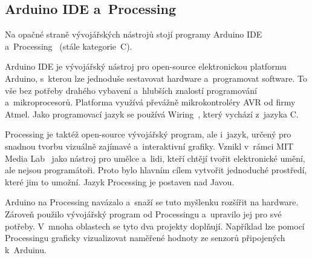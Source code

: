 \subsection{Arduino IDE a~Processing}
% 
% 
%
%
%
%
%
%


Na opačné straně vývojářských nástrojů stojí programy Arduino IDE~\cite{arduino-web} a~Processing~\cite{processing-web} (stále kategorie~C).

Arduino IDE je vývojářský nástroj pro open-source elektronickou platformu Arduino, s~kterou lze jednoduše sestavovat hardware a~programovat software.
To vše bez potřeby drahého vybavení a~hlubších znalostí programování a~mikroprocesorů. 
Platforma využívá převážně mikrokontroléry AVR od firmy Atmel.
Jako programovací jazyk se používá Wiring~\cite{arduino-wiring}, který vychází z~jazyka C.

Processing je taktéž open-source vývojářský program, ale i~jazyk, určený pro snadnou tvorbu vizuálně zajímavé a~interaktivní grafiky.
% 
% 
Vznikl v~rámci MIT Media Lab~\cite{processing-web_overview} jako nástroj pro umělce a~lidi, kteří chtějí tvořit elektronické umění, ale nejsou programátoři.
% 
% 
Proto bylo hlavním cílem vytvořit jednoduché prostředí, které jim to umožní. Jazyk Processing je postaven nad Javou.
% 
% 

Arduino na Processing navázalo a~snaží se tuto myšlenku rozšířit na hardware. 
Zároveň použilo vývojářský program od Processingu a~upravilo jej pro své potřeby. 
V~mnoha oblastech se tyto dva projekty doplňují. 
% 
% 
Například lze pomocí Processingu graficky vizualizovat naměřené hodnoty ze senzorů připojených k~Arduinu.

